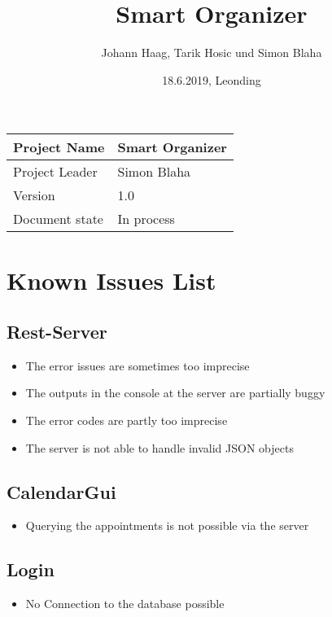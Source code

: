 \documentclass[12pt]{scrartcl}
\title{Smart Organizer}
\author{Johann Haag, Tarik Hosic und Simon Blaha}
\date{18.6.2019, Leonding}
\begin{document}
    \maketitle
    \begin{flushleft}
    \begin{tabular}{|l|l|}
    \hline
    Project Name & Smart Organizer \\ \hline
    Project Leader & Simon Blaha \\ \hline
    Version & 1.0\\ \hline
    Document state & In process \\ \hline
    \end{tabular}
    \end{flushleft}

    \pagebreak
    \tableofcontents
    \pagebreak

    \section{Known Issues List}
    \subsection{Rest-Server}
    \begin{itemize}
        \item The error issues are sometimes too imprecise
        \item The outputs in the console at the server are partially buggy
        \item The error codes are partly too imprecise
        \item The server is not able to handle invalid JSON objects 
    \end{itemize}

    \subsection{CalendarGui}
    \begin{itemize}
        \item Querying the appointments is not possible via the server
    \end{itemize}

    \subsection{Login}
    \begin{itemize}
        \item No Connection to the database possible
    \end{itemize}
\end{document}
